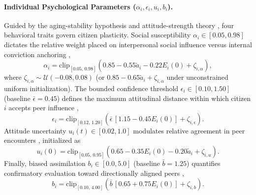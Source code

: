 \documentclass{article}
\begin{document}
\paragraph{Individual Psychological Parameters ($\alpha_i, \epsilon_i, u_i, b_i$).}
Guided by the aging-stability hypothesis \citep{alwin1991aging, kiley2020measuring} and attitude-strength theory \citep{sherif1961social, howe2017attitude}, four behavioral traits govern citizen plasticity. Social susceptibility $\alpha_i \in [0.05, 0.98]$ dictates the relative weight placed on interpersonal social influence versus internal conviction anchoring \citep{friedkin1990social},
\begin{equation}
    \alpha_i = \mathrm{clip}_{[0.05,\, 0.98]}\!\left(0.85 - 0.55\tilde{a}_i - 0.22 E_i(0) + \zeta_{i,\alpha}\right),
    \label{eq:susceptibility}
\end{equation}
where $\zeta_{i,\alpha} \sim \mathcal{U}(-0.08, 0.08)$ (or $0.85 - 0.65\tilde{a}_i + \zeta_{i,\alpha}$ under unconstrained uniform initialization). The bounded confidence threshold $\epsilon_i \in [0.10, 1.50]$ (baseline $\bar{\epsilon} = 0.45$) defines the maximum attitudinal distance within which citizen $i$ accepts peer influence \citep{deffuant2000mixing, hegselmann2002opinion},
\begin{equation}
    \epsilon_i = \mathrm{clip}_{[0.12,\, 1.20]}\!\left(\bar{\epsilon}\,[1.15 - 0.45 E_i(0)] + \zeta_{i,\epsilon}\right).
    \label{eq:bounded_confidence}
\end{equation}
Attitude uncertainty $u_i(t) \in [0.02, 1.0]$ modulates relative agreement in peer encounters \citep{deffuant2002how}, initialized as
\begin{equation}
    u_i(0) = \mathrm{clip}_{[0.05,\, 0.95]}\!\left(0.65 - 0.35 E_i(0) - 0.20\tilde{a}_i + \zeta_{i,u}\right).
    \label{eq:initial_uncertainty}
\end{equation}
Finally, biased assimilation $b_i \in [0.0, 5.0]$ (baseline $\bar{b} = 1.25$) quantifies confirmatory evaluation toward directionally aligned peers \citep{lord1979biased, dandekar2013biased},
\begin{equation}
    b_i = \mathrm{clip}_{[0.10,\, 4.00]}\!\left(\bar{b}\,[0.65 + 0.75 E_i(0)] + \zeta_{i,b}\right).
    \label{eq:assimilation_bias}
\end{equation}
\end{document}
